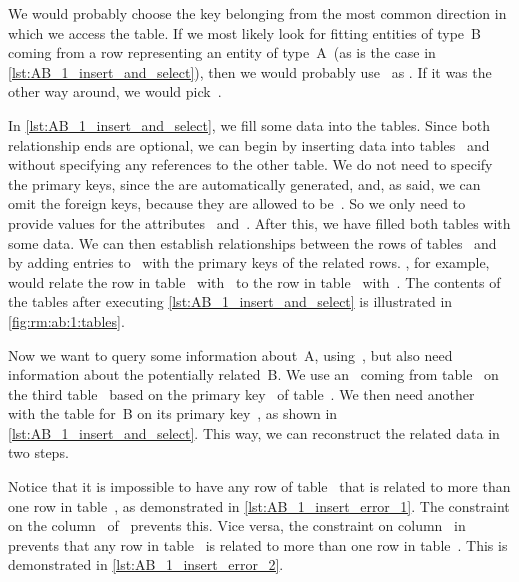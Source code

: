We would probably choose the key belonging from the most common direction in which we access the table.
If we most likely look for fitting entities of type~B coming from a row representing an entity of type~A~(as is the case in \cref{lst:AB_1_insert_and_select}), then we would probably use~ as .
If it was the other way around, we would pick~.

In \cref{lst:AB_1_insert_and_select}, we fill some data into the tables.
Since both relationship ends are optional, we can begin by inserting data into tables~ and~ without specifying any references to the other table.
We do not need to specify the primary keys, since the are automatically generated, and, as said, we can omit the foreign keys, because they are allowed to be~.
So we only need to provide values for the attributes~ and~.
After this, we have filled both tables with some data.
We can then establish relationships between the rows of tables~ and~ by adding entries to~ with the primary keys of the related rows.
, for example, would relate the row in table~ with~ to the row in table~ with~.
The contents of the tables after executing \cref{lst:AB_1_insert_and_select} is illustrated in \cref{fig:rm:ab:1:tables}.

Now we want to query some information about~A, using~, but also need information about the potentially related~B.
We use an~ coming from table~ on the third table~ based on the primary key~ of table~.
We then need another~ with the table for~B on its primary key~, as shown in \cref{lst:AB_1_insert_and_select}.
This way, we can reconstruct the related data in two steps.

Notice that it is impossible to have any row of table~ that is related to more than one row in table~, as demonstrated in \cref{lst:AB_1_insert_error_1}.
The  constraint on the column~ of~ prevents this.
Vice versa, the  constraint on column~ in~ prevents that any row in table~ is related to more than one row in table~.
This is demonstrated in \cref{lst:AB_1_insert_error_2}.

